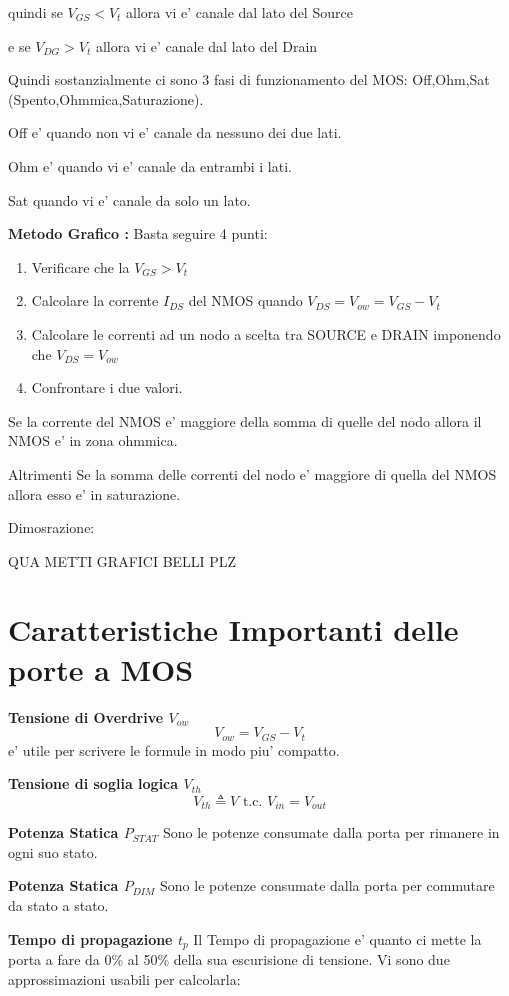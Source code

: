 \documentclass[\main/main.tex]{subfiles}
\begin{document}
quindi se $V_{GS} < V_t$ allora vi e' canale dal lato del Source

e se $V_{DG} > V_t$ allora vi e' canale dal lato del Drain


Quindi sostanzialmente ci sono 3 fasi di funzionamento del MOS: Off,Ohm,Sat (Spento,Ohmmica,Saturazione).

Off e' quando non vi e' canale da nessuno dei due lati.

Ohm e' quando vi e' canale da entrambi i lati.

Sat quando vi e' canale da solo un lato.

\textbf{Metodo Grafico :}
Basta seguire 4 punti:
\begin{enumerate}
	\item Verificare che la $V_{GS} > V_t$
	\item Calcolare la corrente $I_{DS}$ del NMOS quando $V_{DS} = V_{ow} = V_{GS} - V_{t}$
	\item Calcolare le correnti ad un nodo a scelta tra SOURCE e DRAIN imponendo che $V_{DS} = V_{ow}$
	\item Confrontare i due valori.
\end{enumerate}
Se la corrente del NMOS e' maggiore della somma di quelle del nodo allora il NMOS e' in zona ohmmica.

Altrimenti Se la somma delle correnti del nodo e' maggiore di quella del NMOS allora esso e' in saturazione.

Dimosrazione:

QUA METTI GRAFICI BELLI PLZ

\clearpage
\section{Caratteristiche Importanti delle porte a MOS}
\textbf{Tensione di Overdrive $V_{ow}$}
\[ V_{ow} = V_{GS} - V_t\]
e' utile per scrivere le formule in modo piu' compatto.

\textbf{Tensione di soglia logica $V_{th}$}
\[V_{th} \triangleq V \text{ t.c. } V_{in} = V_{out}\]

\textbf{Potenza Statica $P_{STAT}$}
Sono le potenze consumate dalla porta per rimanere in ogni suo stato.

\textbf{Potenza Statica $P_{DIM}$}
Sono le potenze consumate dalla porta per commutare da stato a stato.

\textbf{Tempo di propagazione $t_p$}
Il Tempo di propagazione e' quanto ci mette la porta a fare da 0\% al 50\% della sua escurisione di tensione.
Vi sono due approssimazioni usabili per calcolarla:
\end{document}
